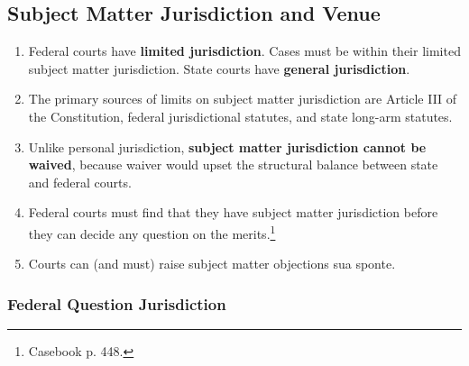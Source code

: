 \subsection{Subject Matter Jurisdiction and Venue}

\begin{enumerate}
    \item Federal courts have \textbf{limited jurisdiction}. Cases must be 
    within their limited subject matter jurisdiction. State courts have 
    \textbf{general jurisdiction}.
    \item The primary sources of limits on subject matter jurisdiction are 
    Article III of the Constitution, federal jurisdictional statutes, and 
    state long-arm statutes.
    \item Unlike personal jurisdiction, \textbf{subject matter jurisdiction 
    cannot be waived}, because waiver would upset the structural balance 
    between state and federal courts.
    \item Federal courts must find that they have subject matter jurisdiction 
    before they can decide any question on the merits.\footnote{Casebook p.  
    448.}
    \item Courts can (and must) raise subject matter objections sua sponte.
\end{enumerate}

\subsubsection{Federal Question Jurisdiction}

